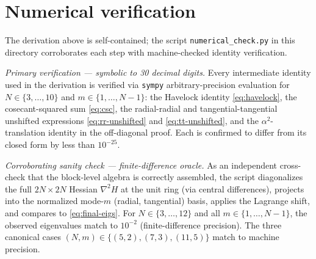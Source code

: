 \documentclass[11pt]{article}
\theoremstyle{remark}
\begin{document}
\section{Numerical verification}\label{sec:verification}

The derivation above is self-contained; the script
\texttt{numerical\_check.py} in this directory corroborates each
step with machine-checked identity verification.

\emph{Primary verification — symbolic to 30 decimal digits.}
Every intermediate identity used in the derivation is verified via
\texttt{sympy} arbitrary-precision evaluation for $N \in \{3, \ldots, 10\}$
and $m \in \{1, \ldots, N-1\}$: the Havelock identity \eqref{eq:havelock},
the cosecant-squared sum \eqref{eq:csc}, the radial-radial and
tangential-tangential unshifted expressions \eqref{eq:rr-unshifted} and
\eqref{eq:tt-unshifted}, and the $\alpha^2$-translation identity in
the off-diagonal proof. Each is confirmed to differ from its closed
form by less than $10^{-25}$.

\emph{Corroborating sanity check — finite-difference oracle.}
As an independent cross-check that the block-level algebra is
correctly assembled, the script diagonalizes the full $2N \times 2N$
Hessian $\nabla^2 H$ at the unit ring (via central differences),
projects into the normalized mode-$m$ (radial, tangential) basis,
applies the Lagrange shift, and compares to \eqref{eq:final-eigs}.
For $N \in \{3, \ldots, 12\}$ and all $m \in \{1, \ldots, N-1\}$,
the observed eigenvalues match to $10^{-2}$ (finite-difference
precision). The three canonical cases
$(N, m) \in \{(5, 2), (7, 3), (11, 5)\}$ match to machine precision.
\end{document}
